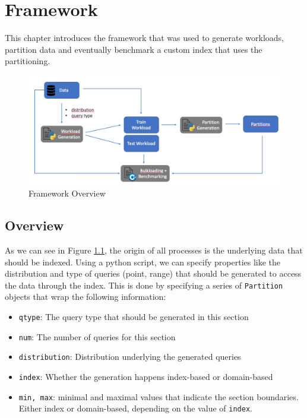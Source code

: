 \thispagestyle{plain}
\chapter{Framework}
This chapter introduces the framework that was used to generate workloads, partition data and eventually benchmark a custom index that uses the partitioning.
\begin{figure}[H]
    \centering
    \includegraphics[width=\textwidth]{figures/pipeline.png}
    \caption{Framework Overview}
    \label{fig:framework}
\end{figure}

\section{Overview}
As we can see in Figure \ref{fig:framework}, the origin of all processes is the underlying data that should be indexed. Using a python script, we can specify properties like the distribution and type of queries (point, range) that should be generated to access the data through the index. This is done by specifying a series of \verb|Partition| objects that wrap the following information:

\begin{minipage}{\textwidth}
\begin{itemize}
    \item \verb|qtype|: The query type that should be generated in this section
    \item \verb|num|: The number of queries for this section
    \item \verb|distribution|: Distribution underlying the generated queries
    \item \verb|index|: Whether the generation happens index-based or domain-based
    \item \verb|min, max|: minimal and maximal values that indicate the section boundaries. Either index or domain-based, depending on the value of \verb|index|.
\end{itemize}
\vspace{\parskip}
\end{minipage}


